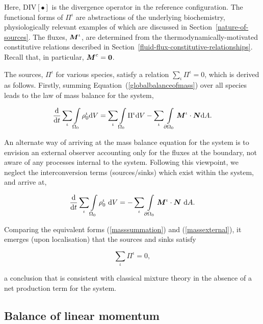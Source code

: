 \noindent Here, $\mathrm{DIV[\bullet]}$ is the divergence operator in
the reference configuration. The functional forms of $\Pi^\iota$ are
abstractions of the underlying biochemistry, physiologically relevant
examples of which are discussed in
Section~\ref{nature-of-sources}. The fluxes, $\mbox{\boldmath$ M$}^\iota$, are
determined from the thermodynamically-motivated constitutive relations
described in
Section~\ref{fluid-flux-constitutive-relationships}. Recall that, in
particular, $\mbox{\boldmath$ M$}^{c} = {\bf 0}$.

The sources, $\Pi^\iota$ for various species, satisfy a relation
$\sum\limits_\iota\Pi^\iota = 0$, which is derived as
follows. Firstly, summing Equation~(\ref{globalbalanceofmass}) over
all species leads to the law of mass balance for the system,

\begin{equation}
\frac{\mathrm{d}}{\mathrm{d}t} \sum\limits_\iota\int\limits_{\Omega_0}
\rho_0^\iota \mathrm{d}V = \sum\limits_\iota \int\limits_{\Omega_0}
\Pi^\iota \mathrm{d}V - \sum\limits_\iota
\int\limits_{\partial\Omega_0}\mbox{\boldmath$ M$}^\iota\cdot\mbox{\boldmath$ N$} \mathrm{d}A.
\label{masssummation}
\end{equation}

\noindent An alternate way of arriving at the mass balance equation
for the system is to envision an external observer accounting only for
the fluxes at the boundary, not aware of any processes internal to the
system. Following this viewpoint, we neglect the interconversion terms
(sources/sinks) which exist within the system, and arrive at,

\begin{equation}
\frac{\mathrm{d}}{\mathrm{d}t}\sum\limits_\iota
\int\limits_{\Omega_0}\rho_0^\iota \ \mathrm{d}V =
-\sum\limits_\iota\int\limits_{\partial\Omega_0}\mbox{\boldmath$ M$}^\iota\cdot\mbox{\boldmath$ N$}
\ \mathrm{d}A.
\label{massexternal}
\end{equation}

\noindent Comparing the equivalent forms (\ref{masssummation}) and
(\ref{massexternal}), it emerges (upon localisation) that the sources
and sinks satisfy

\begin{equation}
\sum\limits_\iota\Pi^\iota = 0,
\label{masssummationresult}
\end{equation}

\noindent a conclusion that is consistent with classical mixture
theory \citep{TruesdellNoll:65} in the absence of a net production
term for the system.

\subsection{Balance of linear momentum}
\label{balance-of-linear-momentum}

